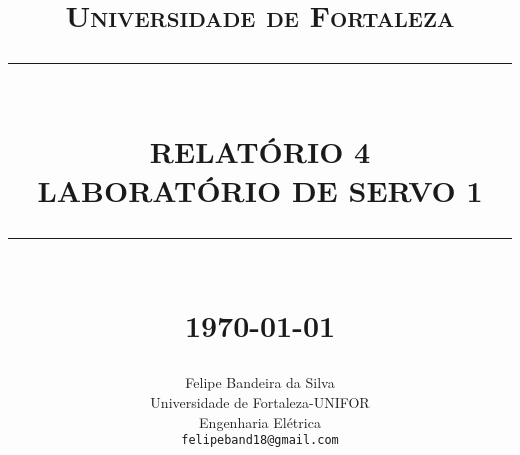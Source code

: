 %




\newcommand{\HRule}[1]{\rule{\linewidth}{#1}} 	%

\makeatletter							%
\def\printtitle{%
    {\centering \@title\par}}
\makeatother									

\makeatletter							%
\def\printauthor{%
    {\centering \large \@author}}				
\makeatother							

\title{	\normalsize \textsc{Universidade de Fortaleza} 	%
		 	\\[2.0cm]													%
			\HRule{0.5pt} \\										%
			\LARGE \textbf{\uppercase{Relatório 4\\Laboratório  de Servo 1}}	%
			\HRule{2pt} \\ [0.5cm]								%
			\normalsize \today									%
		}

\author{
		Felipe Bandeira da Silva\\	
		Universidade de Fortaleza-UNIFOR\\	
		Engenharia Elétrica\\
        \texttt{felipeband18@gmail.com} \\
}


